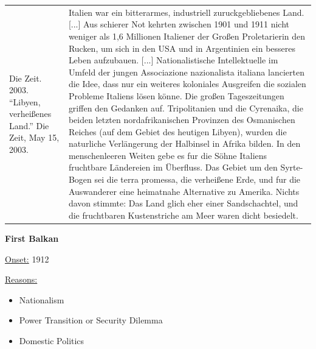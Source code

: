 {\begin{longtable}{p{}p{}}
\\
Die Zeit. 2003. “Libyen, verheißenes Land.” Die Zeit, May 15, 2003. & Italien war ein bitterarmes, industriell zuruckgebliebenes Land. [...] Aus schierer Not kehrten zwischen 1901 und 1911 nicht weniger als 1,6 Millionen Italiener der Großen Proletarierin den Rucken, um sich in den USA und in Argentinien ein besseres Leben aufzubauen. [...] Nationalistische Intellektuelle im Umfeld der jungen Associazione nazionalista italiana lancierten die Idee, dass nur ein weiteres koloniales Ausgreifen die sozialen Probleme Italiens lösen könne. Die großen Tageszeitungen griffen den Gedanken auf. Tripolitanien und die Cyrenaika, die beiden letzten nordafrikanischen Provinzen des Osmanischen Reiches (auf dem Gebiet des heutigen Libyen), wurden die naturliche Verlängerung der Halbinsel in Afrika bilden. In den menschenleeren Weiten gebe es fur die Söhne Italiens fruchtbare Ländereien im Überfluss. Das Gebiet um den Syrte-Bogen sei die terra
promessa, die verheißene Erde, und fur die Auswanderer eine heimatnahe Alternative zu Amerika. Nichts davon stimmte: Das Land glich eher einer Sandschachtel, und die fruchtbaren Kustenstriche am Meer waren dicht besiedelt.
\\
\end{longtable}}
\clearpage
         \textbf{First Balkan} 

          \underline{Onset:} 1912         

\underline{Reasons:}
\begin{itemize}
\item Nationalism
\item Power Transition or Security Dilemma
\item Domestic Politics
\end{itemize}

